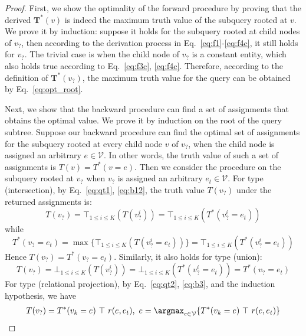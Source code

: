 \thm*
\begin{proof}
    First, we show the optimality of the forward procedure by proving that the derived $\mathbf{T}^*(v)$ is indeed the maximum truth value of the subquery rooted at $v$.
    We prove it by induction: suppose it holds for the subquery rooted at child nodes of $v_?$, then according to the derivation process in Eq.~\ref{eq:f1}-\ref{eq:f4c}, it still holds for $v_?$.
    The trivial case is when the child node of $v_?$ is a constant entity, which also holds true according to Eq.~\ref{eq:f3c}, \ref{eq:f4c}.
    Therefore, according to the definition of $\mathbf{T}^*(v_?)$, the maximum truth value for the query can be obtained by Eq.~\ref{eq:opt_root}.

    Next, we show that the backward procedure can find a set of assignments that obtains the optimal value.
    We prove it by induction on the root of the query subtree.
    Suppose our backward procedure can find the optimal set of assignments for the subquery rooted at every child node $v$ of $v_?$, when the child node is assigned an arbitrary $e\in\mathcal{V}$. In other words, the truth value of such a set of assignments is $T(v)=T^*(v=e)$.
    Then we consider the procedure on the subquery rooted at $v_?$ when $v_?$ is assigned an arbitrary $e_t\in\mathcal{V}$. For type  (intersection), by Eq.~\ref{eq:qt1}, \ref{eq:b12}, the truth value $T(v_?)$ under the returned assignments is:
    \begin{equation}
        T(v_?) = \top_{1\leq i\leq K}(T(v_?^i)) = \top_{1\leq i\leq K}(T^*(v_?^i=e_t))
    \end{equation}
    while
    \begin{equation}
        T^*(v_?=e_t) = \max\{\top_{1\leq i\leq K}(T(v_?^i=e_t))\} = \top_{1\leq i\leq K}(T^*(v_?^i=e_t))
    \end{equation}
    Hence $T(v_?)=T^*(v_?=e_t)$. Similarly, it also holds for type  (union):
    \begin{equation}
        T(v_?) = \bot_{1\leq i\leq K}(T(v_?^i)) = \bot_{1\leq i\leq K}(T^*(v_?^i=e_t)) = T^*(v_?=e_t)
    \end{equation}
    For type  (relational projection), by Eq.~\ref{eq:qt2}, \ref{eq:b3}, and the induction hypothesis, we have
    \begin{equation}
    \begin{aligned}
        &T(v_?) = T^*(v_k=e)\ \top\ r(e, e_t),\ e=\argmax_{e\in\mathcal{V}}\{T^{*}(v_k=e)\ \top\ r(e, e_t)\} \\

\end{aligned}
\end{equation}
\end{proof}
